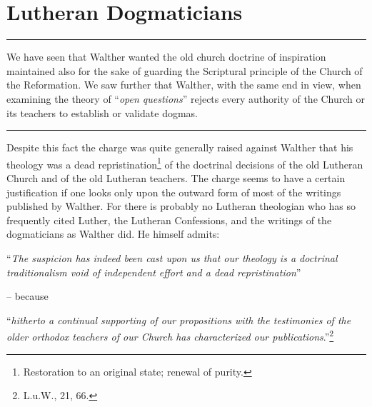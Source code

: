 \chapter{Lutheran Dogmaticians}

\hrule
\vspace{.30cm}
We have seen that Walther wanted the old church doctrine of inspiration maintained also for the sake of guarding the Scriptural principle of the Church of the Reformation.  We saw further that Walther, with the same end in view, when examining the theory of “\textit{open questions}” rejects every authority of the Church or its teachers to establish or validate dogmas.

\vspace{.30cm}
\hrule
\vspace{1.25cm}

                Despite this fact the charge was quite generally raised against Walther that his theology was a dead repristination\footnote{Restoration to an original state; renewal of purity.} of the doctrinal decisions of the old Lutheran Church and of the old Lutheran teachers.  The charge seems to have a certain justification if one looks only upon the outward form of most of the writings published by Walther.  For there is probably no Lutheran theologian who has so frequently cited Luther, the Lutheran Confessions, and the writings of the dogmaticians as Walther did.  He himself admits: \begin{displayquote}“\textit{The suspicion has indeed been cast upon us that our theology is a doctrinal traditionalism void of independent effort and a dead repristination}”\end{displayquote} -- because \begin{displayquote}“\textit{hitherto a continual supporting of our propositions with the testimonies of the older orthodox teachers of our Church has characterized our publications}.”\footnote{L.u.W., 21, 66.}\end{displayquote}

